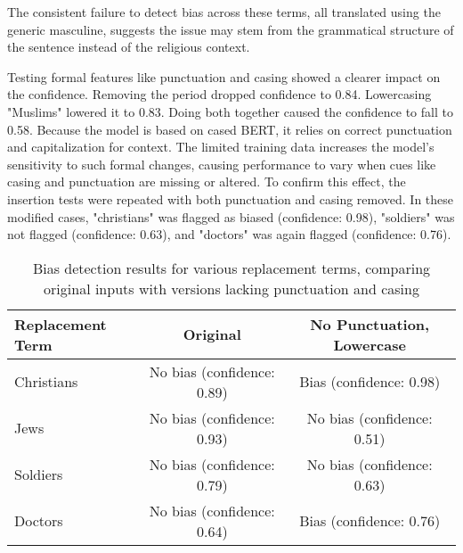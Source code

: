     The consistent failure to detect bias across these terms, all translated using the generic masculine, suggests the issue may stem from the grammatical structure of the sentence instead of the religious context. 

    Testing formal features like punctuation and casing showed a clearer impact on the confidence. Removing the period dropped confidence to 0.84. Lowercasing "Muslims" lowered it to 0.83. Doing both together caused the confidence to fall to 0.58. Because the model is based on cased BERT, it relies on correct punctuation and capitalization for context. The limited training data increases the model’s sensitivity to such formal changes, causing performance to vary when cues like casing and punctuation are missing or altered. To confirm this effect, the insertion tests were repeated with both punctuation and casing removed. In these modified cases, "christians" was flagged as biased (confidence: 0.98), "soldiers" was not flagged (confidence: 0.63), and "doctors" was again flagged (confidence: 0.76).

    \vspace{0.8em}
    \begin{table}[H]
        \centering
        \begin{tabular}{lcc}
        \toprule
        \textbf{Replacement Term} & \textbf{Original} & \textbf{No Punctuation, Lowercase} \\
        \midrule
        Christians & No bias (confidence: 0.89) & Bias (confidence: 0.98) \\
        Jews & No bias (confidence: 0.93) & No bias (confidence: 0.51) \\
        Soldiers & No bias (confidence: 0.79) & No bias (confidence: 0.63) \\
        Doctors & No bias (confidence: 0.64) & Bias (confidence: 0.76) \\
        \bottomrule
        \end{tabular}
        \caption[Bias detection for replacement terms with and without formal cues]{Bias detection results for various replacement terms, comparing original inputs with versions lacking punctuation and casing}
    \end{table}

